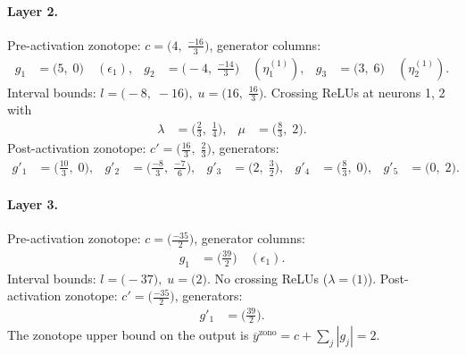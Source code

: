 \documentclass[11pt]{article}
\begin{document}
\paragraph{Layer 2.}
Pre-activation zonotope: $c = \bigl(4,\; \frac{-16}{3}\bigr)$, generator columns:
\begin{align*}
g_{1} &= \bigl(5,\; 0\bigr) \quad (\epsilon_{1}), &
g_{2} &= \bigl(-4,\; \frac{-14}{3}\bigr) \quad (\eta^{(1)}_{1}), &
g_{3} &= \bigl(3,\; 6\bigr) \quad (\eta^{(1)}_{2}).
\end{align*}
Interval bounds: $l = \bigl(-8,\; -16\bigr), \; u = \bigl(16,\; \frac{16}{3}\bigr)$. 
Crossing ReLUs at neurons 1, 2 with
\begin{align*}
\lambda &= \bigl(\frac{2}{3},\; \frac{1}{4}\bigr), & \mu &= \bigl(\frac{8}{3},\; 2\bigr).
\end{align*}
Post-activation zonotope: $c' = \bigl(\frac{16}{3},\; \frac{2}{3}\bigr)$, generators:
\begin{align*}
g'_{1} &= \bigl(\frac{10}{3},\; 0\bigr), &
g'_{2} &= \bigl(\frac{-8}{3},\; \frac{-7}{6}\bigr), &
g'_{3} &= \bigl(2,\; \frac{3}{2}\bigr), &
g'_{4} &= \bigl(\frac{8}{3},\; 0\bigr), &
g'_{5} &= \bigl(0,\; 2\bigr).
\end{align*}
\paragraph{Layer 3.}
Pre-activation zonotope: $c = \bigl(\frac{-35}{2}\bigr)$, generator columns:
\begin{align*}
g_{1} &= \bigl(\frac{39}{2}\bigr) \quad (\epsilon_{1}).
\end{align*}
Interval bounds: $l = \bigl(-37\bigr), \; u = \bigl(2\bigr)$. 
No crossing ReLUs ($\lambda = \bigl(1\bigr)$).
Post-activation zonotope: $c' = \bigl(\frac{-35}{2}\bigr)$, generators:
\begin{align*}
g'_{1} &= \bigl(\frac{39}{2}\bigr).
\end{align*}
The zonotope upper bound on the output is $\overline{y}^{\text{zono}} = c + \sum_j |g_j| = 2$.
\end{document}

